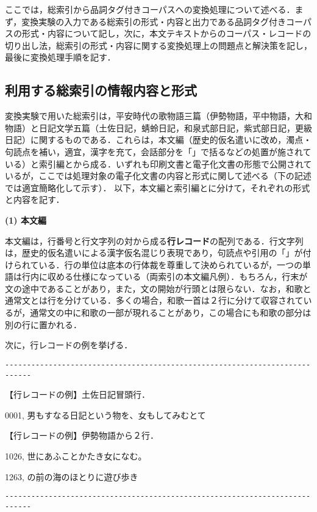 ここでは，総索引から品詞タグ付きコーパスへの変換処理について述べる．まず，変換実験の入力である総索引の形式・内容と出力である品詞タグ付きコーパスの形式・内容について記し，次に，本文テキストからのコーパス・レコードの切り出し法，総索引の形式・内容に関する変換処理上の問題点と解決策を記し，最後に変換処理手順を記す．

\subsection{利用する総索引の情報内容と形式}
\label{sec:ConcStyle}
変換実験で用いた総索引は，平安時代の歌物語三篇（伊勢物語，平中物語，大和物語）\cite{UTA1994}と日記文学五篇（土佐日記，蜻蛉日記，和泉式部日記，紫式部日記，更級日記）\cite{NIKKI1996}に関するものである．これらは，本文編（歴史的仮名遣いに改め，濁点・句読点を補い，適宜，漢字を充て，会話部分を「」で括るなどの処置が施されている）と索引編とから成る．いずれも印刷文書と電子化文書の形態で公開されているが，ここでは処理対象の電子化文書の内容と形式に関して述べる（下の記述では適宜簡略化して示す）．
以下，本文編と索引編とに分けて，それぞれの形式と内容を記す．

\noindent
{\bf (1) 本文編}

本文編は，行番号と行文字列の対から成る{\bf 行レコード}の配列である．行文字列は，歴史的仮名遣いによる漢字仮名混じり表現であり，句読点や引用の「」が付けられている．行の単位は底本の行体裁を尊重して決められているが，一つの単語は行内に収める仕様になっている（両索引の本文編凡例）．もちろん，行末が文の途中であることがあり，また，文の開始が行頭とは限らない．なお，和歌と通常文とは行を分けている．多くの場合，和歌一首は２行に分けて収容されているが，通常文の中に和歌の一部が現れることがあり，この場合にも和歌の部分は別の行に置かれる．

次に，行レコードの例を挙げる．

\vspace{-8pt}\begin{verbatim}
----------------------------------------------------------------------------
\end{verbatim}\vspace{-8pt}
\noindent
【行レコードの例】土佐日記冒頭行．

0001, 男もすなる日記という物を、女もしてみむとて　　

\noindent
【行レコードの例】伊勢物語から２行．

1026, 世にあふことかたき女になむ。

1263, の前の海のほとりに遊び歩き　　

\vspace{-8pt}\begin{verbatim}
----------------------------------------------------------------------------
\end{verbatim}\vspace{-8pt}

